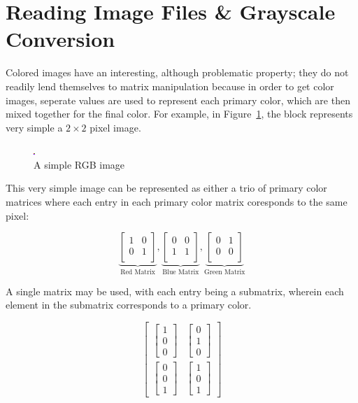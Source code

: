 \section{Reading Image Files \& Grayscale Conversion}

Colored images have an interesting, although problematic property; they do not readily lend themselves to matrix manipulation because in order to get color images, seperate values are used to represent each primary color, which are then mixed together for the final color. For example, in Figure~\ref{fig:example}, the block represents very simple a $2 \times 2$ pixel image.

    \begin{figure}[ht]
      \centering
      \includegraphics[scale=30]{./img/sqr.png}
      \caption{A simple RGB image}
      \label{fig:example}
    \end{figure}

This very simple
image can be
represented as either
a trio of primary
color matrices where
each entry in each
primary        color
matrix coresponds to
the same pixel:

\[
  \underbrace{
    \begin{bmatrix}
      1&0\\
      0&1\\
    \end{bmatrix}
  }_{\text{Red
  Matrix}}
  ,
  \underbrace{
    \begin{bmatrix}
      0&0\\
      1&1\\
    \end{bmatrix}
  }_{\text{Blue
  Matrix}}
  ,
  \underbrace{
    \begin{bmatrix}
      0&1\\
      0&0\\
    \end{bmatrix}
  }_{\text{Green
  Matrix}}
\]

A
single
matrix
may
be
used,
with
each
entry
being
a
submatrix,
wherein
each
element
in
the
submatrix
corresponds
to
a
primary
color.

\[  
  \begin{bmatrix}
    \begin{bmatrix}1\\0\\0\end{bmatrix}
    &
    \begin{bmatrix}0\\1\\0\end{bmatrix}\\[2em]
    \begin{bmatrix}0\\0\\1\end{bmatrix}
    &
    \begin{bmatrix}1\\0\\1\end{bmatrix}
  \end{bmatrix}
\]

